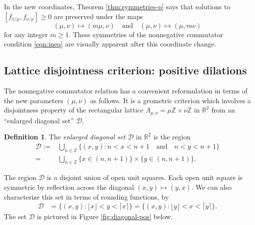 \documentclass[11pt, letterpaper, reqno]{amsart}
\theoremstyle{definition}
\newtheorem{defi}[thm]{Definition}
\numberwithin{equation}{section}
\newcommand{\RR}{\ensuremath{\mathbb{R}}}
\newcommand{\ZZ}{\ensuremath{\mathbb{Z}}}
\newcommand{\floor}[1]{\lfloor{#1}\rfloor}
\newcommand{\ceil}[1]{\lceil{#1}\rceil}
\newcommand{\um}{{\mu}}
\newcommand{\vm}{{\nu}}
\newcommand{\cD}{\mathcal{D}}
\begin{document}
In the new coordinates, Theorem \ref{thm:symmetries-p} says that 
solutions to $[f_{1/\um}, f_{\vm/\um}] \geq 0$ are  preserved under the maps
\[ 
(\um, \vm) \mapsto (m \um, \vm) \quad\text{and}\quad 
(\um, \vm)\mapsto (\um, m\vm) 
\]
for any integer $m\geq 1$.
These  symmetries of the nonnegative commutator condition \eqref{eqn:ineq} are  visually apparent after this  coordinate change.


%
%
\subsection{Lattice disjointness criterion: positive dilations}
\label{subsec:lattice-disjoint}

{ 
The  nonnegative commutator relation has a convenient reformulation in terms of the new parameters 
$(\um, \vm)$ as follows. 
It is a geometric criterion which involves  a  disjointness property
of the rectangular  lattice $\Lambda_{\um, \vm}= \um \ZZ \times \vm \ZZ$ in $\RR^2$ 
from an ``enlarged diagonal set''
$\mathcal{D}$.

\begin{defi}
The  {\em enlarged diagonal set } 
$\cD$ in $\RR^2$ is  the region
\begin{align}\label{def:regionD}
\cD :=& \bigcup_{n \in \ZZ} \{ (x,y) : n < x < n+1 \quad \mbox{and} \quad  n < y < n+1 \} \nonumber \\
 =&  \bigcup_{n \in \ZZ} \{ x \in (n, n+1)\} \times \{ y \in (n, n+1)\}.
\end{align}
\end{defi}


The  region $\mathcal{D}$ 
is a disjoint union of open unit squares. 
  Each open unit square  is symmetric by reflection across the diagonal $(x,y) \mapsto (y,x)$.
We can also characterize this set in terms of rounding functions, by 
\begin{align} 
\cD &= \{ (x,y) : \floor{x} < y < \ceil{x} \} 
= \{ (x,y) : \floor{y} < x < \ceil{y} \}. 
\end{align}
The set $\cD$ is pictured in Figure \ref{fig:diagonal-pos} below.


}
\end{document}
